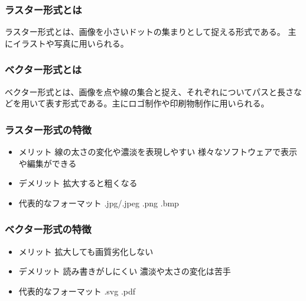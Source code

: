 \documentclass{ltjsarticle}
\begin{document}
\subsubsection{ラスター形式とは}
ラスター形式とは、画像を小さいドットの集まりとして捉える形式である。
主にイラストや写真に用いられる。
\subsubsection{ベクター形式とは}
ベクター形式とは、画像を点や線の集合と捉え、それぞれについてパスと長さなどを用いて表す形式である。主にロゴ制作や印刷物制作に用いられる。
\subsubsection{ラスター形式の特徴}
\begin{itemize}
    \item メリット
	\subitem 線の太さの変化や濃淡を表現しやすい
	\subitem 様々なソフトウェアで表示や編集ができる
    \item デメリット
	\subitem 拡大すると粗くなる
    \item 代表的なフォーマット
	\subitem .jpg/.jpeg
	\subitem .png
	\subitem .bmp
\end{itemize}
\subsubsection{ベクター形式の特徴}
\begin{itemize}
    \item メリット
	\subitem 拡大しても画質劣化しない
    \item デメリット
	\subitem 読み書きがしにくい
	\subitem 濃淡や太さの変化は苦手
    \item 代表的なフォーマット
	\subitem .svg
	\subitem .pdf
\end{itemize}
\end{document}
